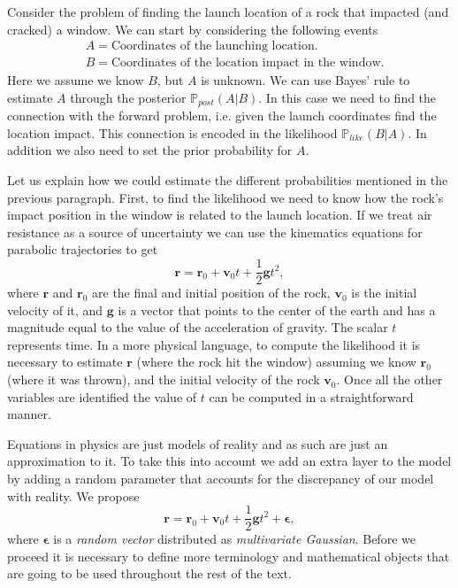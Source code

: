 \documentclass[12pt]{book}
\newcommand{\post}{\mathbb{P}_{post}}
\newcommand{\like}{\mathbb{P}_{like}}
\begin{document}
Consider the problem of finding the launch location of a rock that impacted (and cracked) a window. 
We can start by considering the following events
\begin{align*}
& A=\text{Coordinates of the launching location}.\\
& B= \text{Coordinates of the  location impact in the window}.
\end{align*}
Here we assume we know $B$, but $A$ is unknown. We can use Bayes' rule to estimate $A$ through
the posterior $\post(A|B)$. In this case
we need to find the connection with the forward problem, i.e. given 
the launch coordinates find the location impact. This connection is encoded in the likelihood $\like(B|A)$.
In addition we also need to set the prior probability for $A$. 
\newline



Let us explain how we could estimate the different probabilities mentioned in the previous paragraph. 
First, to find the likelihood
we need to know how the rock's impact position  in the window  is related to the launch location. 
If we treat air resistance as a source of uncertainty  we can use
the kinematics equations  for parabolic trajectories to get \cite{arnol2013mathematical}
\begin{equation}\label{eqnKinematics}
\textbf{r}=\textbf{r}_{0}+\textbf{v}_{0}t+\frac{1}{2}\textbf{g}t^{2},
\end{equation} 
where $\textbf{r}$ and $\textbf{r}_{0}$ are the final and initial position of the rock, 
$\textbf{v}_{0}$ is 
the initial velocity of it,  and $\textbf{g}$ is  a vector that points to the center of the earth and has a 
magnitude equal to the value of the acceleration of gravity. The scalar $t$ represents time.
In a more physical language, to compute the likelihood it is necessary to estimate $\textbf{r}$ (where the 
rock hit the window) assuming we know $\textbf{r}_{0}$ (where it was thrown), and the initial velocity 
of the rock $\textbf{v}_{0}$. 
Once all the other variables are identified the value of $t$ can be computed in a straightforward manner. 

Equations in physics are just models of reality and as such are just an approximation to it. To take
this into account we add an extra layer to the model by adding a random parameter that accounts
for the discrepancy of our model with reality. We propose 
\begin{equation}\label{eqnParabolicEpsilon}
\textbf{r}=\textbf{r}_{0}+\textbf{v}_{0}t+\frac{1}{2}\textbf{g}t^{2}+\mathbf{\epsilon},
\end{equation} 
where $\mathbf{\epsilon}$ is a \textit{random vector} distributed as \textit{multivariate Gaussian}. 
Before we proceed it is necessary to define more terminology and mathematical objects  that are going 
to be used throughout the rest of the text. 
\end{document}
